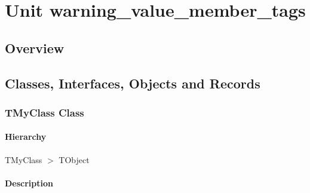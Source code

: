 \documentclass{report}
\newif\ifpdf
\begin{document}
\chapter{Unit warning{\_}value{\_}member{\_}tags}
\label{warning_value_member_tags}
\section{Overview}
\begin{description}
\item[\texttt{\begin{ttfamily}TMyClass\end{ttfamily} Class}]
\end{description}
\section{Classes, Interfaces, Objects and Records}
\ifpdf
\subsection*{\large{\textbf{TMyClass Class}}\normalsize\hspace{1ex}\hrulefill}
\else
\subsection*{TMyClass Class}
\fi
\label{warning_value_member_tags.TMyClass}
\subsubsection*{\large{\textbf{Hierarchy}}\normalsize\hspace{1ex}\hfill}
TMyClass {$>$} TObject
\subsubsection*{\large{\textbf{Description}}\normalsize\hspace{1ex}\hfill}


 
\end{document}
